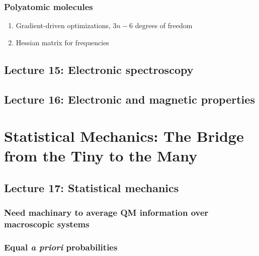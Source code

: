 \documentclass[11pt]{article}
\begin{document}
\subsubsection{Polyatomic molecules}
\label{sec:org1f3cc6a}
\begin{enumerate}
\item Gradient-driven optimizations, \(3n-6\) degrees of freedom
\item Hessian matrix for frequencies
\end{enumerate}

\subsection{Lecture 15: Electronic spectroscopy}
\label{sec:orgd76b593}
\subsection{Lecture 16: Electronic and magnetic properties}
\label{sec:org19f71b3}

\section{Statistical Mechanics: The Bridge from the Tiny to the Many}
\label{sec:org3ea33da}

\subsection{Lecture 17: Statistical mechanics}
\label{sec:orgcf60a5d}
\subsubsection{Need machinary to average QM information over macroscopic systems}
\label{sec:org25744ff}
\subsubsection{Equal \emph{a priori} probabilities}
\label{sec:orgd70fc95}
\end{document}

